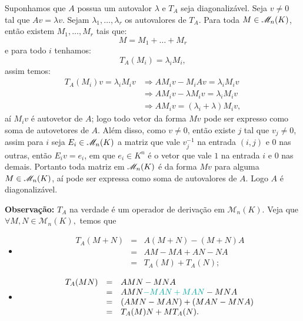 \documentclass[11pt,a4paper]{article}
\begin{document}
{{\task[\pers{b}] Suponhamos que $A$ possua um autovalor $\lambda$ e $T_A$ seja diagonalizável. Seja $v\neq 0$ tal que $Av=\lambda v$. Sejam $\lambda_1,\dots,\lambda_r$ os autovalores de $T_A$. Para toda $M\in\mathcal{M}_{n}(K)$, então existem $M_1,\dots,M_r$ tais que:
\[
M=M_1+\dots+M_r
\]
e para todo $i$ tenhamos:
\[
T_A(M_i)=\lambda_i M_i,
\]
assim temos:
\begin{align*}
T_A(M_i)v=\lambda_i M_iv
&\Rightarrow AM_iv-M_iAv=\lambda_i M_iv\\
&\Rightarrow AM_iv-\lambda M_iv=\lambda_i M_iv\\
&\Rightarrow AM_iv=(\lambda_i+\lambda)M_iv,
\end{align*}
aí $M_iv$ é autovetor de $A$; logo todo vetor da forma $Mv$ pode ser expresso como soma de autovetores de $A$. Além disso, como $v\neq 0$, então existe $j$ tal que $v_j\neq 0$, assim para $i$ seja $E_i\in\mathcal{M}_{n}(K)$ a matriz que vale $v_j^{-1}$ na entrada $(i,j)$ e $0$ nas outras, então $E_iv=e_i$, em que $e_i\in K^n$ é o vetor que vale $1$ na entrada $i$ e $0$ nas demais. Portanto toda matriz em $\mathcal{M}_{n}(K)$ é da forma $Mv$ para alguma $M\in\mathcal{M}_{n}(K)$, aí pode ser expressa como soma de autovalores de $A$. Logo $A$ é diagonalizável.
}

\textbf{Observação:}  $T_A$ na verdade é um operador de derivação em $\mathcal{M}_n(K).$ Veja que $\forall M, N \in \mathcal{M}_n(K),$ temos que
\begin{itemize}
\item 
\[
\begin{array}{rcl}
T_A(M + N) &=& A(M+N) - (M + N)A \\
&=& AM - MA + AN - NA \\
&=& T_A(M) + T_A(N);
\end{array}
\]
\item 
\[
\begin{array}{rcl}
T_A(MN) &=& AMN - MNA \\
&=& AMN \textcolor{Emerald}{ - MAN + MAN} - MNA \\
&=& (AMN - MAN) + (MAN - MNA) \\
&=& T_A(M)N + MT_A(N).
\end{array}
\]
\end{itemize}
}
\end{document}
